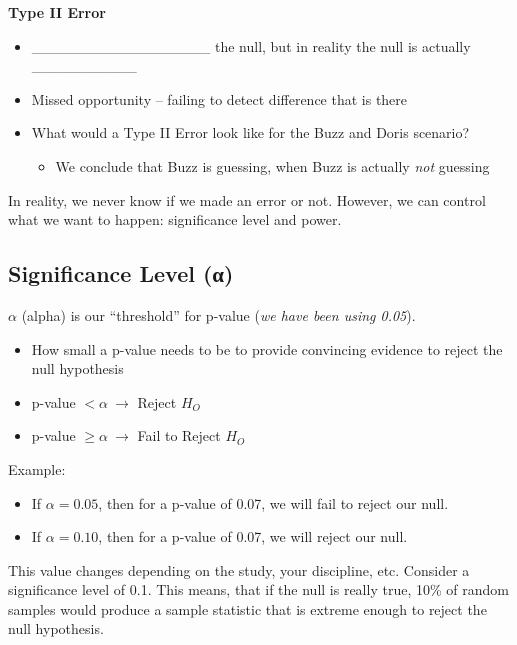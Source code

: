 \documentclass[
  letterpaper,
  DIV=11,
  numbers=noendperiod]{scrartcl}
\providecommand{\tightlist}{%
  \setlength{\itemsep}{0pt}\setlength{\parskip}{0pt}}
\begin{document}
\textbf{Type II Error}

\begin{itemize}
\item
  \_\_\_\_\_\_\_\_\_\_\_\_\_\_\_\_\_ the null, but in reality the null
  is actually \_\_\_\_\_\_\_\_\_\_
\item
  Missed opportunity -- failing to detect difference that is there
\item
  What would a Type II Error look like for the Buzz and Doris scenario?

  \begin{itemize}
  \tightlist
  \item
    We conclude that Buzz is guessing, when Buzz is actually \emph{not}
    guessing
  \end{itemize}
\end{itemize}

In reality, we never know if we made an error or not. However, we can
control what we want to happen: significance level and power.

\subsection{Significance Level (α)}\label{significance-level-ux3b1}

\(\alpha\) (alpha) is our ``threshold'' for p-value (\emph{we have been
using 0.05}).

\begin{itemize}
\item
  How small a p-value needs to be to provide convincing evidence to
  reject the null hypothesis
\item
  p-value \(< \alpha\  \rightarrow\) Reject \(H_{O}\)
\item
  p-value \(\geq \alpha\  \rightarrow\) Fail to Reject \(H_{O}\)
\end{itemize}

Example:

\begin{itemize}
\item
  If \(\alpha = 0.05\), then for a p-value of 0.07, we will fail to
  reject our null.
\item
  If \(\alpha = 0.10\), then for a p-value of 0.07, we will reject our
  null.
\end{itemize}

This value changes depending on the study, your discipline, etc.
Consider a significance level of 0.1. This means, that if the null is
really true, 10\% of random samples would produce a sample statistic
that is extreme enough to reject the null hypothesis.
\end{document}
